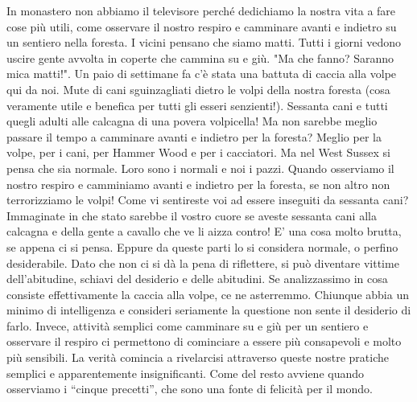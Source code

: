 In monastero non abbiamo il televisore perché dedichiamo la nostra vita
a fare cose più utili, come osservare il nostro respiro e camminare
avanti e indietro su un sentiero nella foresta. I vicini pensano che
siamo matti. Tutti i giorni vedono uscire gente avvolta in coperte che
cammina su e giù. "Ma che fanno? Saranno mica matti!". Un paio di
settimane fa c'è stata una battuta di caccia alla volpe qui da noi. Mute
di cani sguinzagliati dietro le volpi della nostra foresta (cosa
veramente utile e benefica per tutti gli esseri senzienti!). Sessanta
cani e tutti quegli adulti alle calcagna di una povera volpicella! Ma
non sarebbe meglio passare il tempo a camminare avanti e indietro per la
foresta? Meglio per la volpe, per i cani, per Hammer Wood e per i
cacciatori. Ma nel West Sussex si pensa che sia normale. Loro sono i
normali e noi i pazzi. Quando osserviamo il nostro respiro e camminiamo
avanti e indietro per la foresta, se non altro non terrorizziamo le
volpi! Come vi sentireste voi ad essere inseguiti da sessanta cani?
Immaginate in che stato sarebbe il vostro cuore se aveste sessanta cani
alla calcagna e della gente a cavallo che ve li aizza contro! E' una
cosa molto brutta, se appena ci si pensa. Eppure da queste parti lo si
considera normale, o perfino desiderabile. Dato che non ci si dà la pena
di riflettere, si può diventare vittime dell'abitudine, schiavi del
desiderio e delle abitudini. Se analizzassimo in cosa consiste
effettivamente la caccia alla volpe, ce ne asterremmo. Chiunque abbia un
minimo di intelligenza e consideri seriamente la questione non sente il
desiderio di farlo. Invece, attività semplici come camminare su e giù
per un sentiero e osservare il respiro ci permettono di cominciare a
essere più consapevoli e molto più sensibili. La verità comincia a
rivelarcisi attraverso queste nostre pratiche semplici e apparentemente
insignificanti. Come del resto avviene quando osserviamo i “cinque
precetti”, che sono una fonte di felicità per il mondo.

